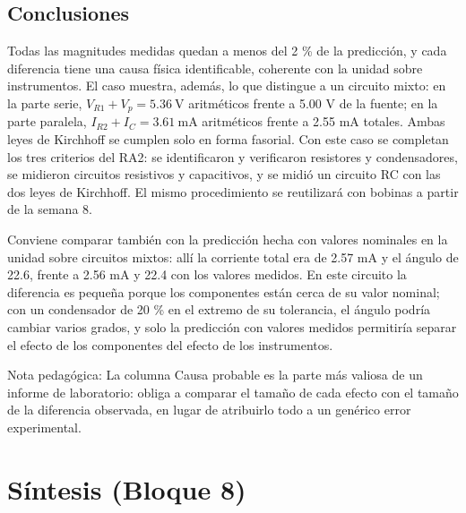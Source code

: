 \documentclass[11pt,letterpaper]{article}
\begin{document}
\subsection{Conclusiones}

Todas las magnitudes medidas quedan a menos del 2 \% de la predicción, y cada diferencia tiene una causa física identificable, coherente con la unidad sobre instrumentos. El caso muestra, además, lo que distingue a un circuito mixto: en la parte serie, $V_{R1} + V_p = 5.36\ \text{V}$ aritméticos frente a 5.00 V de la fuente; en la parte paralela, $I_{R2} + I_C = 3.61\ \text{mA}$ aritméticos frente a 2.55 mA totales. Ambas leyes de Kirchhoff se cumplen solo en forma fasorial. Con este caso se completan los tres criterios del RA2: se identificaron y verificaron resistores y condensadores, se midieron circuitos resistivos y capacitivos, y se midió un circuito RC con las dos leyes de Kirchhoff. El mismo procedimiento se reutilizará con bobinas a partir de la semana 8.

Conviene comparar también con la predicción hecha con valores nominales en la unidad sobre circuitos mixtos: allí la corriente total era de 2.57 mA y el ángulo de 22.6\textdegree{}, frente a 2.56 mA y 22.4\textdegree{} con los valores medidos. En este circuito la diferencia es pequeña porque los componentes están cerca de su valor nominal; con un condensador de \textpm{}20 \% en el extremo de su tolerancia, el ángulo podría cambiar varios grados, y solo la predicción con valores medidos permitiría separar el efecto de los componentes del efecto de los instrumentos.

\begin{nota}{Nota pedagógica:}
La columna \guillemotleft{}Causa probable\guillemotright{} es la parte más valiosa de un informe de laboratorio: obliga a comparar el tamaño de cada efecto con el tamaño de la diferencia observada, en lugar de atribuirlo todo a un genérico \guillemotleft{}error experimental\guillemotright{}.
\end{nota}

\section{Síntesis (Bloque 8)}
\end{document}
